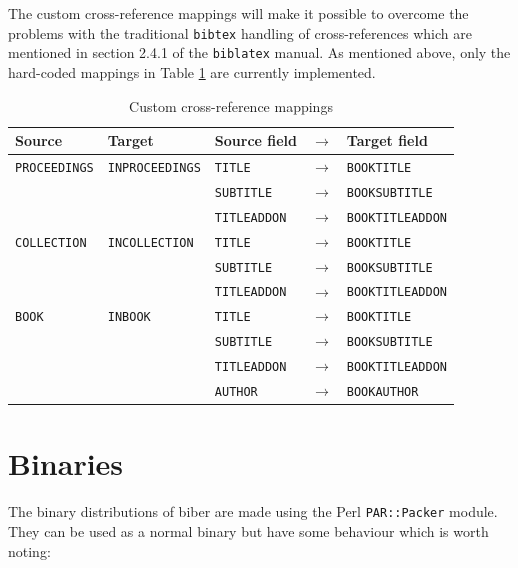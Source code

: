 \documentclass{ltxdockit}
\begin{document}
\noindent The custom cross-reference mappings will make it possible to
overcome the problems with the traditional \verb+bibtex+ handling of
cross-references which are mentioned in section 2.4.1 of the
\verb+biblatex+ manual. As mentioned above, only the hard-coded mappings in
Table \ref{tab:ct} are currently implemented.

\begin{table}
\begin{center}
\small
\begin{tabular}{lllll}
\toprule
Source & Target & Source field & $\rightarrow$ & Target field\\
\midrule
\texttt{PROCEEDINGS} & \texttt{INPROCEEDINGS} & \texttt{TITLE} & $\rightarrow$ & \texttt{BOOKTITLE}\\
& & \texttt{SUBTITLE} & $\rightarrow$ & \texttt{BOOKSUBTITLE}\\
& & \texttt{TITLEADDON} & $\rightarrow$ & \texttt{BOOKTITLEADDON}\\
\cmidrule{3-5}
\texttt{COLLECTION} & \texttt{INCOLLECTION} & \texttt{TITLE} & $\rightarrow$ & \texttt{BOOKTITLE}\\
& & \texttt{SUBTITLE} & $\rightarrow$ & \texttt{BOOKSUBTITLE}\\
& & \texttt{TITLEADDON} & $\rightarrow$ & \texttt{BOOKTITLEADDON}\\
\cmidrule{3-5}
\texttt{BOOK} & \texttt{INBOOK} & \texttt{TITLE} & $\rightarrow$ & \texttt{BOOKTITLE}\\
& & \texttt{SUBTITLE} & $\rightarrow$ & \texttt{BOOKSUBTITLE}\\
& & \texttt{TITLEADDON} & $\rightarrow$ & \texttt{BOOKTITLEADDON}\\
& & \texttt{AUTHOR} & $\rightarrow$ & \texttt{BOOKAUTHOR}\\
\bottomrule
\end{tabular}
\end{center}
\caption{Custom cross-reference mappings}
\label{tab:ct}
\end{table}

\section{Binaries}

The binary distributions of biber are made using the Perl \verb+PAR::Packer+
module. They can be used as a normal binary but have some behaviour which
is worth noting:
\end{document}
